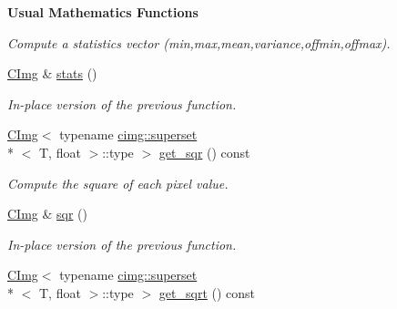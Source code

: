 \begin{Indent}{\bf Usual Mathematics Functions}
\begin{DoxyCompactItemize}
\begin{DoxyCompactList}\small\item\em Compute a statistics vector (min,max,mean,variance,offmin,offmax). \end{DoxyCompactList}\item 
\hypertarget{structcimg__library_1_1_c_img_ac8f214991f5b67f4b9d3aef103e1bb6c}{\hyperlink{structcimg__library_1_1_c_img}{C\-Img} \& \hyperlink{structcimg__library_1_1_c_img_ac8f214991f5b67f4b9d3aef103e1bb6c}{stats} ()}\label{structcimg__library_1_1_c_img_ac8f214991f5b67f4b9d3aef103e1bb6c}

\begin{DoxyCompactList}\small\item\em In-\/place version of the previous function. \end{DoxyCompactList}\item 
\hypertarget{structcimg__library_1_1_c_img_afd1d0b6bfa7bb898a1e390f68d9b1eef}{\hyperlink{structcimg__library_1_1_c_img}{C\-Img}$<$ typename \hyperlink{structcimg__library_1_1cimg_1_1superset}{cimg\-::superset}\\*
$<$ T, float $>$\-::type $>$ \hyperlink{structcimg__library_1_1_c_img_afd1d0b6bfa7bb898a1e390f68d9b1eef}{get\-\_\-sqr} () const }\label{structcimg__library_1_1_c_img_afd1d0b6bfa7bb898a1e390f68d9b1eef}

\begin{DoxyCompactList}\small\item\em Compute the square of each pixel value. \end{DoxyCompactList}\item 
\hypertarget{structcimg__library_1_1_c_img_ada4165dffe31b750b8b51a25b07351c8}{\hyperlink{structcimg__library_1_1_c_img}{C\-Img} \& \hyperlink{structcimg__library_1_1_c_img_ada4165dffe31b750b8b51a25b07351c8}{sqr} ()}\label{structcimg__library_1_1_c_img_ada4165dffe31b750b8b51a25b07351c8}

\begin{DoxyCompactList}\small\item\em In-\/place version of the previous function. \end{DoxyCompactList}\item 
\hypertarget{structcimg__library_1_1_c_img_afe6c72ef590ba6da1f06e310f4dd69cf}{\hyperlink{structcimg__library_1_1_c_img}{C\-Img}$<$ typename \hyperlink{structcimg__library_1_1cimg_1_1superset}{cimg\-::superset}\\*
$<$ T, float $>$\-::type $>$ \hyperlink{structcimg__library_1_1_c_img_afe6c72ef590ba6da1f06e310f4dd69cf}{get\-\_\-sqrt} () const }\label{structcimg__library_1_1_c_img_afe6c72ef590ba6da1f06e310f4dd69cf}


\end{DoxyCompactItemize}
\end{Indent}

